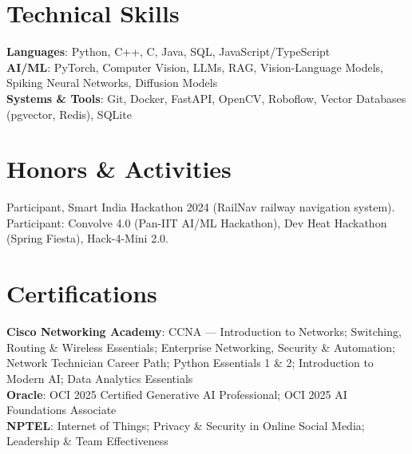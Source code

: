 \documentclass[letterpaper,10pt]{article}
\begin{document}
\section{Technical Skills}
 \begin{itemize}[leftmargin=0.0in, label={}]
    \small{\item{
     \textbf{Languages}{: Python, C++, C, Java, SQL, JavaScript/TypeScript} \\
     \textbf{AI/ML}{: PyTorch, Computer Vision, LLMs, RAG, Vision-Language Models, Spiking Neural Networks, Diffusion Models} \\
     \textbf{Systems \& Tools}{: Git, Docker, FastAPI, OpenCV, Roboflow, Vector Databases (pgvector, Redis), SQLite}
    }}
 \end{itemize}

\section{Honors \& Activities}
\small{Participant, Smart India Hackathon 2024 (RailNav railway navigation system).\\
Participant: Convolve 4.0 (Pan-IIT AI/ML Hackathon), Dev Heat Hackathon (Spring Fiesta), Hack-4-Mini 2.0.}

\section{Certifications}
\small{\textbf{Cisco Networking Academy}: CCNA --- Introduction to Networks; Switching, Routing \& Wireless Essentials; Enterprise Networking, Security \& Automation; Network Technician Career Path; Python Essentials 1 \& 2; Introduction to Modern AI; Data Analytics Essentials \\
\textbf{Oracle}: OCI 2025 Certified Generative AI Professional; OCI 2025 AI Foundations Associate \\
\textbf{NPTEL}: Internet of Things; Privacy \& Security in Online Social Media; Leadership \& Team Effectiveness}
\end{document}
